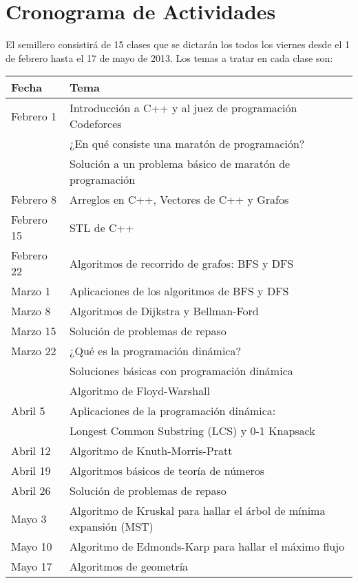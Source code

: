 \documentclass[11pt, oneside]{article}
\theoremstyle{definition}
\theoremstyle{remark}
\begin{document}
\section{Cronograma de Actividades}
El semillero consistirá de 15 clases que se dictarán los todos los viernes desde el 1 de febrero hasta el 17 de mayo de 2013. Los temas a tratar en cada clase son: \\ 

\begin{longtable}{|l|l|}
	\hline
	\textbf{Fecha} & \textbf{Tema} \\
	\hline \hline
	Febrero 1 & Introducción a C++ y al juez de programación Codeforces \cite{Codeforces}\\
	          & ¿En qué consiste una maratón de programación?\\
			  & Solución a un problema básico de maratón de programación  \qquad \qquad \qquad \qquad\\
	\hline
	Febrero 8 & Arreglos en C++, Vectores de C++ y Grafos\\
	\hline
	Febrero 15 & STL de C++\\
	\hline
	Febrero 22 & Algoritmos de recorrido de grafos: BFS y DFS\\
	\hline
	Marzo 1 & Aplicaciones de los algoritmos de BFS y DFS\\
	\hline
	Marzo 8 & Algoritmos de Dijkstra y Bellman-Ford\\
	\hline
	Marzo 15 & Solución de problemas de repaso\\
	\hline
	Marzo 22 & ¿Qué es la programación dinámica?\\
	         & Soluciones básicas con programación dinámica\\
	         & Algoritmo de Floyd-Warshall\\
	\hline
	Abril 5 & Aplicaciones de la programación dinámica:\\
	        & Longest Common Substring (LCS) y 0-1 Knapsack\\
	\hline
	Abril 12 & Algoritmo de Knuth-Morris-Pratt\\
	\hline
	Abril 19 & Algoritmos básicos de teoría de números\\
	\hline
	Abril 26 & Solución de problemas de repaso\\
	\hline
	Mayo 3 & Algoritmo de Kruskal para hallar el árbol de mínima expansión (MST)\\
	\hline
	Mayo 10 & Algoritmo de Edmonds-Karp para hallar el máximo flujo\\
	\hline
	Mayo 17 & Algoritmos de geometría\\
	\hline
\end{longtable}
\end{document}
